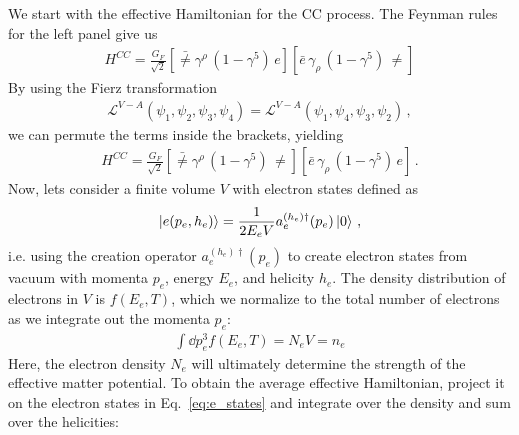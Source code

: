 We start with the effective Hamiltonian for the CC process. The Feynman rules for the left panel give us 
\begin{align}
    H^{CC} = \frac{G_F}{\sqrt{2}}\left[ \bar\ne \gamma^\rho\, (1- \gamma^5)\, e \right] \left[\bar e \,\gamma_\rho\, (1- \gamma^5)\, \ne \right]
\end{align}
By using the Fierz transformation 
\begin{align}
    \mathcal{L}^{V-A}(\psi_1,\psi_2,\psi_3,\psi_4) = \mathcal{L}^{V-A}(\psi_1,\psi_4,\psi_3,\psi_2)\,,
\end{align}
we can permute the terms inside the brackets, yielding
\begin{align}\label{eq:H_fierz}
    H^{CC} = \frac{G_F}{\sqrt{2}}\left[ \bar\ne \gamma^\rho\, (1- \gamma^5)\, \ne \right] \left[\bar e \,\gamma_\rho\, (1- \gamma^5)\, e \right]\,.
\end{align}
Now, lets consider a finite volume $V$ with electron states defined as 
\begin{align}\label{eq:e_states}
    \ket{e(p_e,h_e)} = \frac{1}{2E_eV}a_e^{(h_e)\dagger}(p_e)\ket{0}\,,
\end{align}
i.e. using the creation operator $a_e^{(h_e)\dagger}(p_e)$ to create electron states from vacuum with momenta $p_e$, energy $E_e$, and helicity $h_e$.
The density distribution of electrons in $V$ is $f(E_e,T)$, which we normalize to the total number of electrons as we integrate out the momenta $p_e$:
\begin{align}\label{eq:e_density}
    \int \dd p_e^3 f(E_e,T) = N_e V = n_e
\end{align}
Here, the electron density $N_e$ will ultimately determine the strength of the effective matter potential. 
To obtain the average effective Hamiltonian, project it on the electron states in Eq.~\ref{eq:e_states} and integrate over the density and sum over the helicities:


